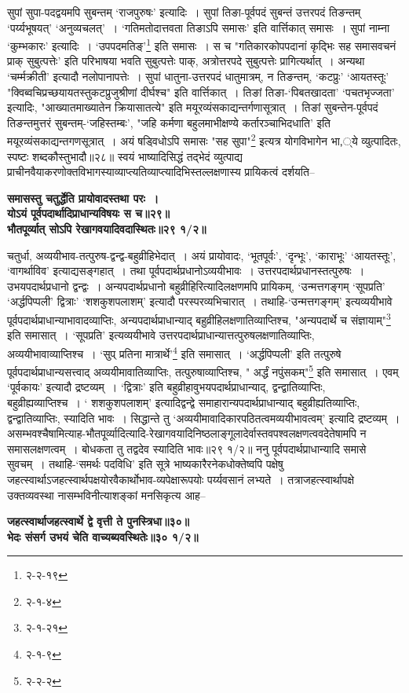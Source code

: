 {{{{ सुपां सुपा-पदद्वयमपि सुबन्तम् `राजपुरुषः' इत्यादिः~।
सुपां तिङा-पूर्वपदं सुबन्तं उत्तरपदं तिङन्तम् `पर्य्यभूषयत्' `अनुव्यचलत्'~।
 `गतिमतोदात्तवता तिङाऽपि समासः' इति वार्त्तिकात् समासः~।
सुपां नाम्ना `कुम्भकारः' इत्यादिः~।
`उपपदमतिङ्'\footnote{२-२-१९} इति समासः~।
स च "गतिकारकोपपदानां कृद्भिः सह समासवचनं प्राक् सुबुत्पत्तेः' इति परिभाषया भवति सुबुत्पत्तेः पाक्, अत्रोत्तरपदे सुबुत्पत्तेः प्रागित्यर्थात्~।
अन्यथा `चर्म्मक्रीती' इत्यादौ नलोपानापत्तेः~।
 सुपां धातुना-उत्तरपदं धातुमात्रम्, न तिङन्तम्, `कटप्रुः' `आयतस्तूः' "क्विब्वचिप्रच्छयायतस्तुकटप्रुजुश्रीणां दीर्घश्च" इति वार्त्तिकात्~।
तिङां तिङा-`पिबतखादता' `पचतभृज्जता' इत्यादिः, "आख्यातमाख्यातेन क्रियासातत्ये" इति मयूरव्यंसकाद्यन्तर्गणासूत्रात्~।
तिङां सुबन्तेन-पूर्वपदं तिङन्तमुत्तरं सुबन्तम्-`जहिस्तम्बः', "जहि कर्मणा बहुलमाभीक्षण्ये कर्तारञ्चाभिदधाति' इति मयूरव्यंसकाद्यन्तगणसूत्रात्~।
 अयं षड्विधोऽपि समासः "सह सुपा"\footnote{२-१-४} इत्यत्र योगविभागेन भा,्ये व्युत्पादितः, स्पष्टः शब्दकौस्तुभादौ॥२८॥
 स्वयं भाष्यादिसिद्धं तद्भेदं व्युत्पाद्य प्राचीनवैयाकरणोक्तविभागस्याव्याप्त्यतिव्याप्त्यादिभिस्तल्लक्षणास्य प्रायिकत्वं दर्शयति--
\begin{center}{\bfseries समासस्तु चतुर्द्धेति प्रायोवादस्तथा परः~।\\
 योऽयं पूर्वपदार्थादिप्राधान्यविषयः स च॥२९॥\\[10pt]
 भौतपूर्व्यात् सोऽपि रेखागवयादिवदास्थितः॥२९ १/२॥}\end{center}
 चतुर्धा, अव्ययीभाव-तत्पुरुष-द्वन्द्व-बहुव्रीहिभेदात्~।
अयं प्रायोवादः, `भूतपूर्वः', `दृन्भूः', {`काराभूः'} `आयतस्तूः', `वागर्थाविव' इत्याद्यसङ्गहात्~।
 तथा पूर्वपदार्थप्रधानोऽव्ययीभावः~।
उत्तरपदार्थप्रधानस्तत्पुरुषः~।
उभयपदार्थप्रधानो द्वन्द्वः~।
अन्यपदार्थप्रधानो बहुव्रीहिरित्यादिलक्षणमपि प्रायिकम्, `उन्मत्तगङ्गम् `सूपप्रति' `अर्द्धपिप्पली' द्वित्राः' `शशकुशपलाशम्' इत्यादौ परस्परव्यभिचारात्~।
तथाहि-`उन्मत्तगङ्गम्' इत्यव्ययीभावे पूर्वपदार्थप्राधान्याभावादव्याप्तिः, अन्यपदार्थप्राधान्याद् बहुव्रीहिलक्षणातिव्याप्तिश्च, "अन्यपदार्थे च संज्ञायाम्"\footnote{२-१-२१} इति समासात्~।
`सूपप्रति' इत्यव्ययीभावे उत्तरपदार्थप्राधान्यात्तत्पुरुषलक्षणातिव्याप्तिः, अव्ययीभावाव्याप्तिश्च~।
`सुप् प्रतिना मात्रार्थे'\footnote{२-१-९} इति समासात्~।
`अर्द्धपिप्पली' इति तत्पुरुषे पूर्वपदार्थप्राधान्यसत्त्वाद् अव्ययीमावातिव्याप्तिः, तत्पुरुषाव्याप्तिश्च, " अर्द्धं नपुंसकम्"\footnote{२-२-२} इति समासात्~।
 एवम् `पूर्वकायः' इत्यादौ द्रष्टव्यम्~।
`द्वित्राः' इति बहुव्रीहावुभयपदार्थप्राधान्याद्, द्वन्द्वातिव्याप्तिः, बहुव्रीह्यव्याप्तिश्च~।
` शशकुशपलाशम्' इत्यादिद्वन्द्वे समाहारान्यपदार्थप्राधान्याद् बहुव्रीह्यतिव्याप्तिः, द्वन्द्वातिव्याप्तिः, स्यादिति भावः~।
 सिद्धान्ते तु `अव्ययीमावादिकारपठितत्वमव्ययीभावत्वम्' इत्यादि द्रष्टव्यम्~।
असम्भवश्चैषामित्याह-भौतपूर्व्यादित्यादि-रेखागवयादिनिष्ठलाङ्गूलादेर्वास्तवपश्वलक्षणत्ववदेतेषामपि न समासलक्षणत्वम्~।
बोधकता तु तद्वदेव स्यादिति भावः॥२९ १/२॥
 ननु पूर्वपदार्थप्राधान्यादि समासे सुवचम्~।
तथाहि-`समर्थः पदविधि' इति सूत्रे भाष्यकारैरनेकधोक्तेष्वपि पक्षेषु जहत्स्वार्थाऽजहत्स्वार्थपक्षयोरवैकार्थोभाव-व्यपेक्षारूपयोः पर्य्यवसानं लभ्यते~।
तत्राजहत्स्वार्थापक्षे उक्तव्यवस्था नासम्भविनीत्याशङ्कां मनसिकृत्य आह--
\begin{center}{\bfseries जहत्स्वार्थाजहत्स्वार्थे द्वे वृत्ती ते पुनस्त्रिधा॥३०॥\\
 भेदः संसर्ग उभयं चेति वाच्यब्यवस्थितेः॥३० १/२॥}\end{center}

}}}}

